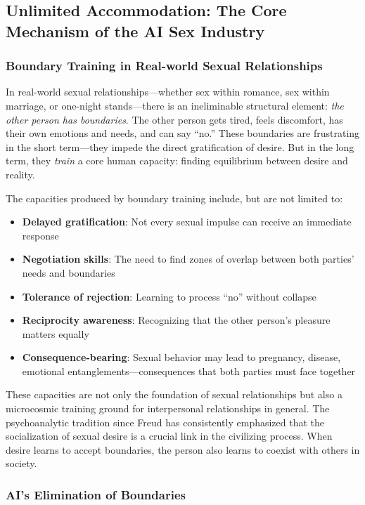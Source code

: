 ﻿\documentclass[12pt,a4paper]{article}
\begin{document}
\subsection{Unlimited Accommodation: The Core Mechanism of the AI Sex Industry}

\subsubsection{Boundary Training in Real-world Sexual Relationships}

In real-world sexual relationships---whether sex within romance, sex within marriage, or one-night stands---there is an ineliminable structural element: \textit{the other person has boundaries}. The other person gets tired, feels discomfort, has their own emotions and needs, and can say ``no.'' These boundaries are frustrating in the short term---they impede the direct gratification of desire. But in the long term, they \textit{train} a core human capacity: finding equilibrium between desire and reality.

The capacities produced by boundary training include, but are not limited to:
\begin{itemize}
\item \textbf{Delayed gratification}: Not every sexual impulse can receive an immediate response
\item \textbf{Negotiation skills}: The need to find zones of overlap between both parties' needs and boundaries
\item \textbf{Tolerance of rejection}: Learning to process ``no'' without collapse
\item \textbf{Reciprocity awareness}: Recognizing that the other person's pleasure matters equally
\item \textbf{Consequence-bearing}: Sexual behavior may lead to pregnancy, disease, emotional entanglements---consequences that both parties must face together
\end{itemize}

These capacities are not only the foundation of sexual relationships but also a microcosmic training ground for interpersonal relationships in general. The psychoanalytic tradition since Freud has consistently emphasized that the socialization of sexual desire is a crucial link in the civilizing process. When desire learns to accept boundaries, the person also learns to coexist with others in society.

\subsubsection{AI's Elimination of Boundaries}
\end{document}
